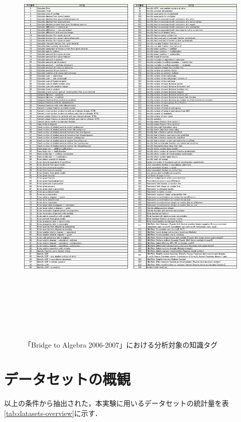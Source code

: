 \begin{figure}[htb]
\begin{center}
\includegraphics[height=600pt]{./img/kTable3.pdf}
\end{center}
\caption{「Bridge to Algebra 2006-2007」における分析対象の知識タグ}
\label{fig:kTable3}
\end{figure}


\section{データセットの概観}
以上の条件から抽出された，本実験に用いるデータセットの統計量を表\ref{tab:datasets-overview}に示す．

